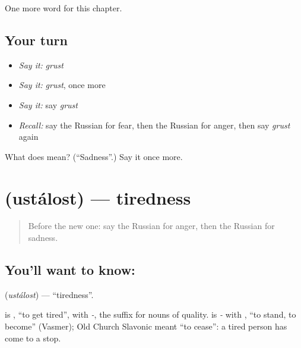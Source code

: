 \begin{grammarlens}[title={What you've built}]
One more word for this chapter.
\end{grammarlens}

\subsection*{Your turn}
\begin{itemize}
\raggedright
  \item \emph{Say it:} \emph{grust}
  \item \emph{Say it:} \emph{grust}, once more
  \item \emph{Say it:} say \emph{grust}
  \item \emph{Recall:} say the Russian for fear, then the Russian for anger, then say \emph{grust} again
\end{itemize}

\begin{tcolorbox}[breakable,colback=teal!4,colframe=teal!35!black,title={Before you move on}]
What does  mean? (\textquotedblleft{}Sadness\textquotedblright{}.) Say it once more.
\end{tcolorbox}
\section[\texorpdfstring{\ru{усталость} (ustálost)}{усталость (ustálost)}]{ (ustálost) — tiredness}

\label{lesson:RU-C34-tiredness}



\begin{quote}
Before the new one: say the Russian for anger, then the Russian for sadness.
\end{quote}

\subsection*{You'll want to know: }
\textbf{} (\emph{ustálost}) — \textquotedblleft{}tiredness\textquotedblright{}.

\begin{cousinweb}
\textbf{} is \emph{}, \textquotedblleft{}to get tired\textquotedblright{}, with \emph{-}, the suffix for nouns of quality. \emph{} is \emph{-} with \emph{}, \textquotedblleft{}to stand, to become\textquotedblright{} (Vasmer); Old Church Slavonic \emph{} meant \textquotedblleft{}to cease\textquotedblright{}: a tired person has come to a stop.
\end{cousinweb}

